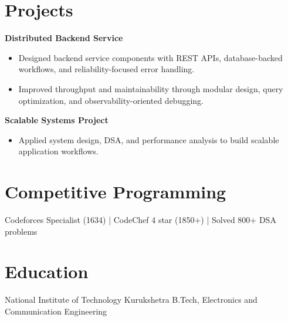 \documentclass[10pt]{article}
\begin{document}
\section*{Projects}
\textbf{Distributed Backend Service}\\
\begin{itemize}
\item Designed backend service components with REST APIs, database-backed workflows, and reliability-focused error handling.
\item Improved throughput and maintainability through modular design, query optimization, and observability-oriented debugging.
\end{itemize}

\textbf{Scalable Systems Project}\\
\begin{itemize}
\item Applied system design, DSA, and performance analysis to build scalable application workflows.
\end{itemize}

\section*{Competitive Programming}
Codeforces Specialist (1634) \quad | \quad CodeChef 4 star (1850+) \quad | \quad Solved 800+ DSA problems

\section*{Education}
National Institute of Technology Kurukshetra \hfill B.Tech, Electronics and Communication Engineering
\end{document}
